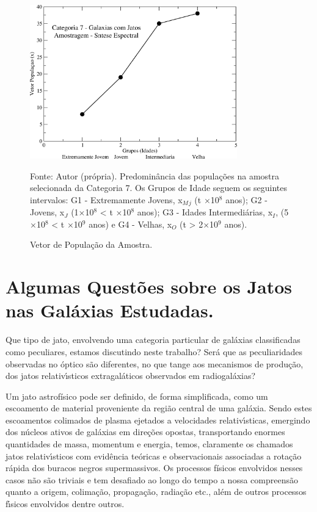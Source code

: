 \begin{figure}[H]
	\centering	
    \caption{Vetor de População da Amostra.}
    \includegraphics[width=0.8\textwidth]{figuras/vetorpop.jpg}
    \vskip 0.5cm
   	\begin{center}
        \normalsize Fonte: Autor (própria). Predominância das populações na amostra selecionada da Categoria 7. Os Grupos de Idade seguem os seguintes intervalos: G1 - Extremamente Jovens, x$_M${$_j$} 
(t  $\times$10$^8$ anos); G2 - Jovens, x{$_J$} (1$\times$10{$^8$} < t $\times$10{$^8$} anos); G3 - Idades Intermediárias, x{$_I$}, (5$\times$10$^8$ < t $\times$10{$^9$} anos) e G4 - Velhas, x{$_O$} (t > 2$\times$10$^9$ anos).
    \end{center}
	\label{fig:vetorpop}
\end{figure}

\section{Algumas Questões sobre os Jatos nas Galáxias Estudadas.} 

Que tipo de jato, envolvendo uma categoria particular de galáxias classificadas como peculiares, estamos discutindo neste trabalho? Será que as peculiaridades observadas no óptico são diferentes, no que tange aos mecanismos de produção, dos jatos relativı́sticos extragaláticos observados em radiogaláxias?

Um jato astrofísico pode ser definido, de forma simplificada, como um escoamento de material proveniente da região central de uma galáxia. Sendo estes escoamentos colimados de plasma ejetados a velocidades relativı́sticas, emergindo dos núcleos ativos de galáxias em direções opostas, transportando enormes quantidades de massa, momentum e energia, temos, claramente os chamados jatos relativı́sticos com evidência teóricas e observacionais associadas a rotação rápida dos buracos negros supermassivos. Os processos físicos envolvidos nesses casos não são triviais e tem desafiado ao longo do tempo a nossa compreensão quanto a origem, colimação, propagação, radiação etc., além de outros processos fı́sicos envolvidos \cite{begelman1984theory, ferrari1998modeling, blandford1990physical, krolik1999active, meier2001magnetohydrodynamic, collin2006quasars} dentre outros. %

